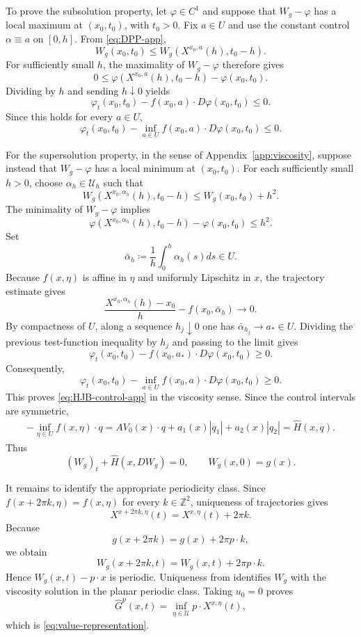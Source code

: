 \documentclass[11pt,reqno,noamsfonts]{amsart}
\theoremstyle{definition}
\theoremstyle{remark}
\newcommand{\Hhat}{\widehat H}
\begin{document}
To prove the subsolution property, let $\varphi\in C^1$ and suppose
that $W_g-\varphi$ has a local maximum at $(x_0,t_0)$, with $t_0>0$.
Fix $a\in U$ and use the constant control $\alpha\equiv a$ on
$[0,h]$. From \eqref{eq:DPP-app},
\[
  W_g(x_0,t_0)
  \le
  W_g(X^{x_0,a}(h),t_0-h).
\]
For sufficiently small $h$, the maximality of
$W_g-\varphi$ therefore gives
\[
  0
  \le
  \varphi(X^{x_0,a}(h),t_0-h)
  -\varphi(x_0,t_0).
\]
Dividing by $h$ and sending $h\downarrow0$ yields
\[
  \varphi_t(x_0,t_0)
  -f(x_0,a)\cdot D\varphi(x_0,t_0)
  \le0.
\]
Since this holds for every $a\in U$,
\[
  \varphi_t(x_0,t_0)
  -
  \inf_{a\in U}
  f(x_0,a)\cdot D\varphi(x_0,t_0)
  \le0.
\]

For the supersolution property, in the sense of
Appendix~\ref{app:viscosity}, suppose instead that
$W_g-\varphi$ has a local minimum at $(x_0,t_0)$. For each sufficiently
small $h>0$, choose $\alpha_h\in\mathcal U_h$ such that
\[
  W_g(X^{x_0,\alpha_h}(h),t_0-h)
  \le W_g(x_0,t_0)+h^2.
\]
The minimality of $W_g-\varphi$ implies
\[
  \varphi(X^{x_0,\alpha_h}(h),t_0-h)
  -\varphi(x_0,t_0)
  \le h^2.
\]
Set
\[
  \bar\alpha_h
  \coloneqq 
  \frac1h\int_0^h\alpha_h(s) ds\in U.
\]
Because $f(x,\eta)$ is affine in $\eta$ and uniformly Lipschitz in
$x$, the trajectory estimate gives
\[
  \frac{X^{x_0,\alpha_h}(h)-x_0}{h}
  -
  f(x_0,\bar\alpha_h)
  \longrightarrow0.
\]
By compactness of $U$, along a sequence $h_j\downarrow0$ one has
$\bar\alpha_{h_j}\to a_*\in U$. Dividing the previous test-function
inequality by $h_j$ and passing to the limit gives
\[
  \varphi_t(x_0,t_0)
  -f(x_0,a_*)\cdot D\varphi(x_0,t_0)
  \ge0.
\]
Consequently,
\[
  \varphi_t(x_0,t_0)
  -
  \inf_{a\in U}
  f(x_0,a)\cdot D\varphi(x_0,t_0)
  \ge0.
\]
This proves \eqref{eq:HJB-control-app} in the viscosity sense.
Since the control intervals are symmetric,
\begin{align*}
  -\inf_{\eta\in U} f(x,\eta)\cdot q
  =
  A V_0(x)\cdot q
  +a_1(x)|q_1|
  +a_2(x)|q_2|=\Hhat(x,q).
\end{align*}
Thus
\[
  (W_g)_t+\Hhat(x,DW_g)=0,
  \qquad
  W_g(x,0)=g(x).
\]

It remains to identify the appropriate periodicity class. Since
$f(x+2\pi k,\eta)=f(x,\eta)$ for every $k\in\mathbb Z^2$,
uniqueness of trajectories gives
\[
  X^{x+2\pi k,\eta}(t)
  =
  X^{x,\eta}(t)+2\pi k.
\]
Because
\[
  g(x+2\pi k)=g(x)+2\pi p\cdot k,
\]
we obtain
\[
  W_g(x+2\pi k,t)
  =
  W_g(x,t)+2\pi p\cdot k.
\]
Hence $W_g(x,t)-p\cdot x$ is periodic. Uniqueness from
 identifies $W_g$ with the viscosity
solution in the planar periodic class.
Taking $u_0=0$ proves
\[
  \widehat G^p(x,t)
  =
  \inf_{\eta\in\mathcal U}
  p\cdot X^{x,\eta}(t),
\]
which is \eqref{eq:value-representation}.
\end{document}
